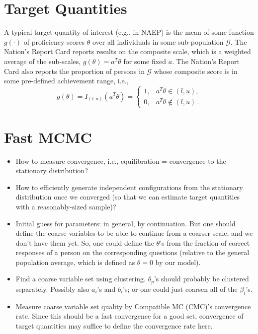 \documentclass{article}
\newcommand{\G}{\mathcal{G}}
\newcommand{\ta}{\theta}
\begin{document}
\section{Target Quantities}
A typical target quantity of interest (e.g., in NAEP) is the mean of some function $g(\cdot)$ of proficiency scores $\ta$ over all individuals in some sub-population $\G$. The Nation's Report Card reports results on the composite scale, which is a weighted average of the sub-scales, $g(\ta) = a^T \ta$ for some fixed $a$. The Nation's Report Card also reports the proportion of persons in $\G$ whose composite score is in some pre-defined achievement range, i.e.,
\begin{equation}
	g(\ta) = I_{(l,u)}(a^T \ta) =
  \begin{cases}
    1, & a^T \ta \in (l,u), \\
    0, & a^T \ta \not \in (l,u)\,.
  \end{cases}
\end{equation}

\section{Fast MCMC}
\begin{itemize}
	\item How to measure convergence, i.e., equilibration = convergence to the stationary distribution? 
	\item How to efficiently generate independent configurations from the stationary distribution once we converged
	(so that we can estimate target quantities with a reasonably-sized sample)?
	\item Initial guess for parameters: in general, by continuation. But one should define the coarse variables
	to be able to continue from a coarser scale, and we don't have them yet. So, one could define the $\ta$'s
	from the fraction of correct responses of a person on the corresponding questions (relative to the general
	population average, which is defined as $\ta=0$ by our model).
	\item Find a coarse variable set using clustering. $\ta_p$'s should probably be clustered separately. 	Possibly also $a_i$'s and $b_i$'s; or one could just coarsen all of the $\beta_i$'s.
	\item Measure coarse variable set quality by Compatible MC (CMC)'s convergence rate. Since this should be a fast convergence for a good set, convergence of target quantities may suffice to define the convergence rate here.
\end{itemize}
\end{document}
